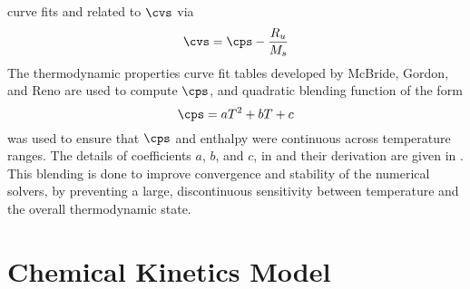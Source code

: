 curve fits and related to $\cvs$ via
\begin{equation}
  \cvs = \cps - \frac{R_u}{M_s}
  \label{specific-heat-conversion}
\end{equation}
The thermodynamic properties curve fit tables developed by McBride, Gordon, and
Reno\cite{McBride} are used to compute $\cps$, and quadratic blending function
of the form
\begin{equation}
  \cps = a T^2 + b T + c
  \label{generic-quad-blending}
\end{equation}
was used to ensure that $\cps$ and enthalpy were continuous across temperature
ranges.  The details of coefficients $a$, $b$, and $c$, in
 and their derivation are given in
.  This blending is done to improve convergence and
stability of the numerical solvers, by preventing a large, discontinuous
sensitivity between temperature and the overall thermodynamic state.

\section{Chemical Kinetics Model}

